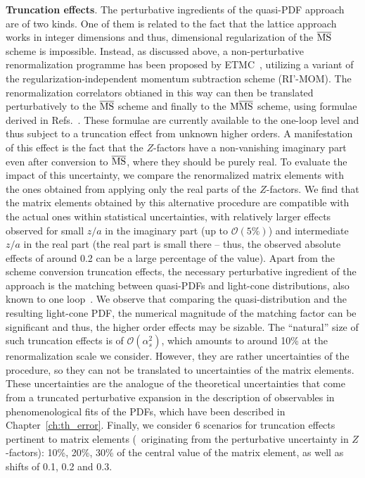 \textbf{Truncation effects}. The perturbative ingredients of the quasi-PDF
approach are of two kinds. One of them is related to the fact that the lattice
approach works in integer dimensions and thus, dimensional regularization of the
$\overline{\mathrm{MS}}$ scheme is impossible. Instead, as discussed above, a non-perturbative
renormalization programme has been proposed by ETMC~\cite{Alexandrou:2017huk},
utilizing a variant of the regularization-independent momentum subtraction
scheme (RI'-MOM). The renormalization correlators obtianed in this way can then
be translated perturbatively to the $\overline{\mathrm{MS}}$ scheme and finally to the ${\rm M}\overline{\mathrm{MS}}$
scheme, using formulae derived in Refs.~\cite{Constantinou:2017sej,
Alexandrou:2019lfo}. These formulae are currently available to the one-loop
level and thus subject to a truncation effect from unknown higher orders. A
manifestation of this effect is the fact that the $Z$-factors have a
non-vanishing imaginary part even after conversion to $\overline{\mathrm{MS}}$, where they should
be purely real. To evaluate the impact of this uncertainty, we compare the
renormalized matrix elements with the ones obtained from applying only the real
parts of the $Z$-factors. We find that the matrix elements obtained by this
alternative procedure are compatible with the actual ones within statistical
uncertainties, with relatively larger effects observed for small $z/a$ in the
imaginary part (up to $\mathcal{O}(5\%)$) and intermediate $z/a$ in the real
part (the real part is small there -- thus, the observed absolute effects of
around 0.2 can be a large percentage of the value). Apart from the scheme
conversion truncation effects, the necessary perturbative ingredient of the
approach is the matching between quasi-PDFs and light-cone distributions, also
known to one loop~\cite{Xiong:2013bka,Izubuchi:2018srq,Alexandrou:2019lfo}.
We observe that comparing the quasi-distribution and the resulting light-cone PDF, the numerical
magnitude of the matching factor can be significant and thus, the higher order
effects may be sizable. The ``natural'' size of such truncation effects is of
$\mathcal{O}(\alpha_s^2)$, which amounts to around 10\% at the renormalization
scale we consider. However, they are rather uncertainties of the procedure, so
they can not be translated to uncertainties of the matrix elements. These
uncertainties are the analogue of the theoretical uncertainties that come from a
truncated perturbative expansion in the description of observables in
phenomenological fits of the PDFs, which have been described in Chapter~\ref{ch:th_error}.
Finally, we consider 6 scenarios for truncation effects
pertinent to matrix elements (\ie\ originating from the perturbative uncertainty
in $Z$-factors): 10\%, 20\%, 30\% of the central value of the matrix element, as
well as shifts of 0.1, 0.2 and 0.3. 

